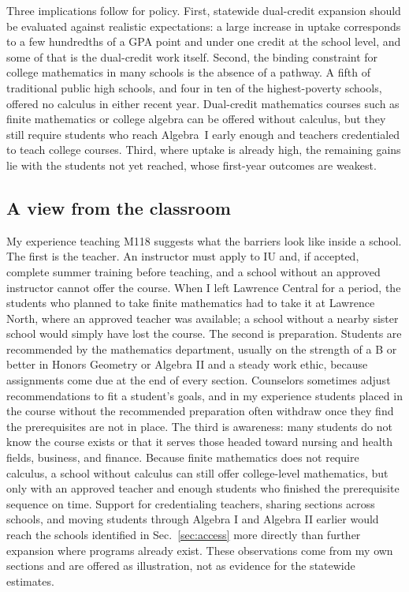\documentclass[aps,prd,reprint,superscriptaddress,nofootinbib,floatfix]{revtex4-2}
\begin{document}
Three implications follow for policy. First, statewide dual-credit expansion should be evaluated against realistic expectations: a large increase in uptake corresponds to a few hundredths of a GPA point and under one credit at the school level, and some of that is the dual-credit work itself. Second, the binding constraint for college mathematics in many schools is the absence of a pathway. A fifth of traditional public high schools, and four in ten of the highest-poverty schools, offered no calculus in either recent year. Dual-credit mathematics courses such as finite mathematics or college algebra can be offered without calculus, but they still require students who reach Algebra~I early enough and teachers credentialed to teach college courses. Third, where uptake is already high, the remaining gains lie with the students not yet reached, whose first-year outcomes are weakest.

\subsection{A view from the classroom}

My experience teaching M118 suggests what the barriers look like inside a school. The first is the teacher. An instructor must apply to IU and, if accepted, complete summer training before teaching, and a school without an approved instructor cannot offer the course. When I left Lawrence Central for a period, the students who planned to take finite mathematics had to take it at Lawrence North, where an approved teacher was available; a school without a nearby sister school would simply have lost the course. The second is preparation. Students are recommended by the mathematics department, usually on the strength of a B or better in Honors Geometry or Algebra II and a steady work ethic, because assignments come due at the end of every section. Counselors sometimes adjust recommendations to fit a student's goals, and in my experience students placed in the course without the recommended preparation often withdraw once they find the prerequisites are not in place. The third is awareness: many students do not know the course exists or that it serves those headed toward nursing and health fields, business, and finance. Because finite mathematics does not require calculus, a school without calculus can still offer college-level mathematics, but only with an approved teacher and enough students who finished the prerequisite sequence on time. Support for credentialing teachers, sharing sections across schools, and moving students through Algebra I and Algebra II earlier would reach the schools identified in Sec.~\ref{sec:access} more directly than further expansion where programs already exist. These observations come from my own sections and are offered as illustration, not as evidence for the statewide estimates.
\end{document}
